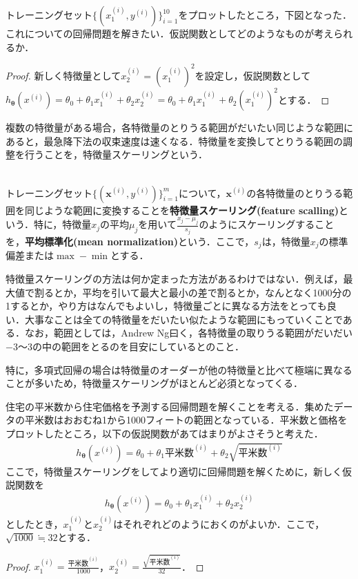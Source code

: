 \begin{qu}
トレーニングセット$\{(x_1^{(i)},y^{(i)})\}_{i=1}^10$をプロットしたところ，下図となった．これについての回帰問題を解きたい．仮説関数としてどのようなものが考えられるか．

\end{qu}
\begin{proof}
新しく特徴量として$x_2^{(i)}=(x_1^{(i)})^2$を設定し，仮説関数として$h_{{\bm \theta}}(x^{(i)})=\theta_0+\theta_1 x_1^{(i)}+\theta_2 x_2^{(i)}=\theta_0+\theta_1 x_1^{(i)}+\theta_2 (x_1^{(i)})^2$とする．
\end{proof}

複数の特徴量がある場合，各特徴量のとりうる範囲がだいたい同じような範囲にあると，最急降下法の収束速度は速くなる．特徴量を変換してとりうる範囲の調整を行うことを，特徴量スケーリングという．

\begin{defi}[特徴量スケーリング]
　\\
トレーニングセット$\{({\bm x}^{(i)},y^{(i)})\}_{i=1}^m$について，${\bm x}^{(i)}$の各特徴量のとりうる範囲を同じような範囲に変換することを{\bf 特徴量スケーリング(feature scalling)}という．特に，特徴量$x_j$の平均$\mu_j$を用いて$\frac{x_j-\mu_j}{s_j}$のようにスケーリングすることを，{\bf 平均標準化(mean normalization)}という．ここで，$s_j$は，特徴量$x_j$の標準偏差または$\max - \min$とする．
\end{defi}
\begin{rem}
特徴量スケーリングの方法は何か定まった方法があるわけではない．例えば，最大値で割るとか，平均を引いて最大と最小の差で割るとか，なんとなく1000分の1するとか，やり方はなんでもよいし，特徴量ごとに異なる方法をとっても良い．大事なことは全ての特徴量をだいたい似たような範囲にもっていくことである．なお，範囲としては，Andrew Ng曰く，各特徴量の取りうる範囲がだいだい$-3〜3$の中の範囲をとるのを目安にしているとのこと．
\end{rem}

特に，多項式回帰の場合は特徴量のオーダーが他の特徴量と比べて極端に異なることが多いため，特徴量スケーリングがほとんど必須となってくる．

\begin{qu}
住宅の平米数から住宅価格を予測する回帰問題を解くことを考える．集めたデータの平米数はおおむね1から1000フィートの範囲となっている．平米数と価格をプロットしたところ，以下の仮説関数があてはまりがよさそうと考えた．
\begin{align*}
h_{{\bm \theta}}(x^{(i)})=\theta_0+\theta_1 平米数^{(i)}+\theta_2 \sqrt{平米数^{(i)}}
\end{align*}
ここで，特徴量スケーリングをしてより適切に回帰問題を解くために，新しく仮説関数を
\begin{align*}
h_{{\bm \theta}}(x^{(i)})=\theta_0+\theta_1 x_1^{(i)}+\theta_2 x_2^{(i)}
\end{align*}
としたとき，$x_1^{(i)}$と$x_2^{(i)}$はそれぞれどのようにおくのがよいか．ここで，$\sqrt{1000}\fallingdotseq 32$とする．
\end{qu}
\begin{proof}
$x_1^{(i)}=\frac{平米数^{(i)}}{1000}$，$x_2^{(i)}=\frac{\sqrt{平米数^{(i)}}}{32}$．
\end{proof}

